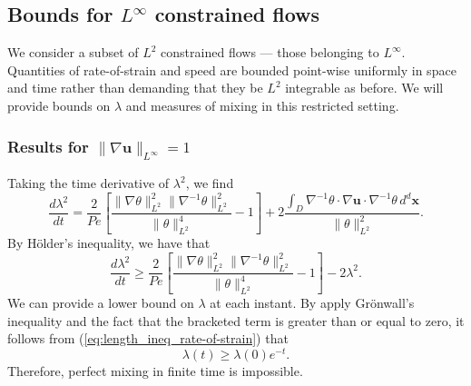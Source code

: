 \documentclass[12pt]{iopart}
\newcommand{\ddt}[1]{\frac{d #1}{dt}}
\newcommand{\hmone}[1]{\|\nabla^{-1} #1\|_{L^{2}}}
\newcommand{\ltwo}[1]{\|#1\|_{L^{2}}}
\newcommand{\hone}[1]{\| \nabla #1\|_{L^{2}}}
\newcommand{\sint}[1]{\int_{D} #1 \, d^{d}\mathbf{x}}
\renewcommand{\vec}[1]{\mathbf{#1}}
\newcommand{\linf}[1]{\| #1 \|_{L^{\infty}}}
\begin{document}
\subsection{Bounds for $L^{\infty}$ constrained flows}
We consider a subset of $L^{2}$ constrained flows --- those belonging to $L^{\infty}$. Quantities of rate-of-strain and speed are bounded point-wise uniformly in space and time rather than demanding that they be $L^2$ integrable as before. We will provide bounds on $\lambda$ and measures of mixing in this restricted setting. 

\label{sec:linfty_flows}
\subsubsection{Results for $\linf{\nabla \vec{u}} = 1$}

Taking the time derivative of $\lambda^2$, we find
%
\begin{equation}
	\ddt{\lambda^2} = \frac{2}{Pe}
		\left[ 
			\frac{\hone{\theta}^2\hmone{\theta}^2}
					{\ltwo{\theta}^4}  
			- 1
		\right]
		+ 2 \frac{\sint{\nabla^{-1}\theta \cdot \nabla\vec{u} \cdot 
							\nabla^{-1}\theta  }}
					  {\ltwo{\theta}^{2}}.
\end{equation}
By H\"older's inequality, we have that
\begin{equation}
\label{eq:length_ineq_rate-of-strain}
	\ddt{\lambda^2} \geq \frac{2}{Pe} \left[ 
			\frac{\hone{\theta}^2\hmone{\theta}^2}
					{\ltwo{\theta}^4}  
			- 1
		\right] - 2  \lambda^2 .
\end{equation}
We can provide a lower bound on $\lambda$ at each instant. By apply Gr\"onwall's inequality and the fact that the bracketed term is greater than or equal to zero, it follows from (\ref{eq:length_ineq_rate-of-strain}) that
%
\begin{equation}
\label{eq:exponential_enstrophy}
	\lambda (t) \geq \lambda(0)e^{- t}.
\end{equation}
%
Therefore, perfect mixing in finite time is impossible.
\end{document}
